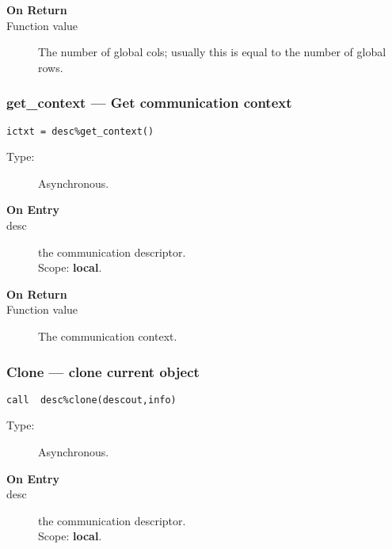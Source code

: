 \begin{description}
\item[\bf On Return]
\item[Function value] The number of global cols; usually this is equal
  to the number of global rows. 
\end{description}


\subsubsection*{get\_context --- Get communication context}

\begin{verbatim}
ictxt = desc%get_context()
\end{verbatim}

\begin{description}
\item[Type:] Asynchronous.
\item[\bf On Entry]
\item[desc] the communication descriptor.\\
Scope: {\bf local}.\\
\end{description}

\begin{description}
\item[\bf On Return]
\item[Function value] The communication context.
\end{description}

\subsubsection*{Clone --- clone current object}

\begin{verbatim}
call  desc%clone(descout,info)
\end{verbatim}

\begin{description}
\item[Type:] Asynchronous.
\item[\bf On Entry]
\item[desc] the communication descriptor.\\
Scope: {\bf local}.\\
\end{description}


